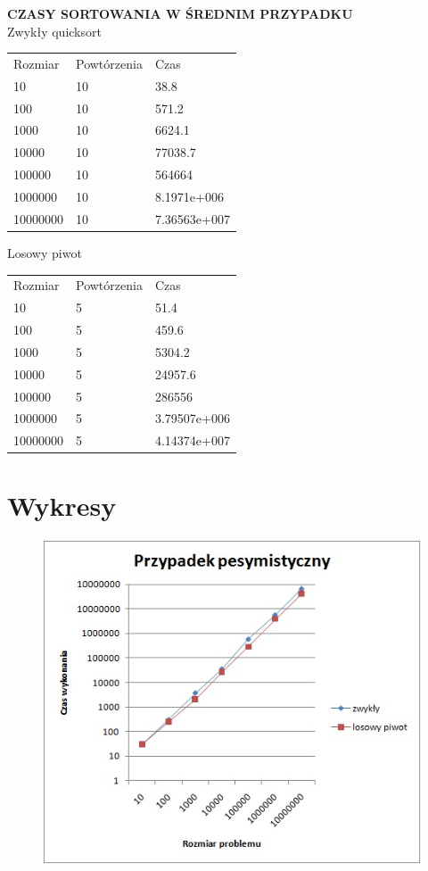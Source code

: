 \documentclass[10pt,oneside]{mwbk}
\begin{document}
	
	\newpage
	\textbf{CZASY SORTOWANIA W ŚREDNIM PRZYPADKU}
	\\
	Zwykły quicksort
	\begin{table}[!h]
	\begin{tabular}{lll}
	Rozmiar & Powtórzenia & Czas         \\
10&10&38.8\\
100&10&571.2\\
1000&10&6624.1\\
10000&10&77038.7\\
100000&10&564664\\
1000000&10&8.1971e+006\\
10000000&10&7.36563e+007\\
	\end{tabular}
	\end{table}
	
	Losowy piwot
		\begin{table}[!h]
	\begin{tabular}{lll}
		Rozmiar & Powtórzenia & Czas         \\
10&5&51.4\\
100&5&459.6\\
1000&5&5304.2\\
10000&5&24957.6\\
100000&5&286556\\
1000000&5&3.79507e+006\\
10000000&5&4.14374e+007\\
	\end{tabular}
	\end{table}

\section {Wykresy}
	\begin{figure}[!ht]
	\centering
	\includegraphics[scale=0.7]{rys/pesymistycznie.jpg}
	\end{figure}
	
\end{document}

